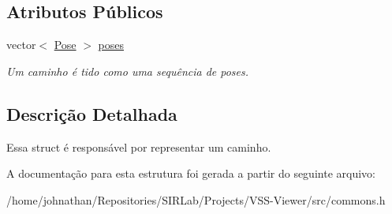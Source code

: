 \subsection*{Atributos Públicos}
\begin{DoxyCompactItemize}
\item 
vector$<$ \hyperlink{structcommon_1_1Pose}{Pose} $>$ \hyperlink{structcommon_1_1Path_ad6561127227344b7c0a24c04dc05cbd4}{poses}\hypertarget{structcommon_1_1Path_ad6561127227344b7c0a24c04dc05cbd4}{}\label{structcommon_1_1Path_ad6561127227344b7c0a24c04dc05cbd4}

\begin{DoxyCompactList}\small\item\em Um caminho é tido como uma sequência de poses. \end{DoxyCompactList}\end{DoxyCompactItemize}


\subsection{Descrição Detalhada}
Essa struct é responsável por representar um caminho. 

A documentação para esta estrutura foi gerada a partir do seguinte arquivo\+:\begin{DoxyCompactItemize}
\item 
/home/johnathan/\+Repositories/\+S\+I\+R\+Lab/\+Projects/\+V\+S\+S-\/\+Viewer/src/commons.\+h\end{DoxyCompactItemize}
